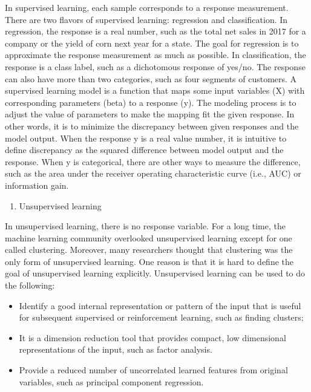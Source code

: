 \documentclass[
  12pt,
]{krantz}
\providecommand{\tightlist}{%
  \setlength{\itemsep}{0pt}\setlength{\parskip}{0pt}}
\begin{document}
In supervised learning, each sample corresponds to a response measurement. There are two flavors of supervised learning: regression and classification. In regression, the response is a real number, such as the total net sales in 2017 for a company or the yield of corn next year for a state. The goal for regression is to approximate the response measurement as much as possible. In classification, the response is a class label, such as a dichotomous response of yes/no. The response can also have more than two categories, such as four segments of customers. A supervised learning model is a function that maps some input variables (X) with corresponding parameters (beta) to a response (y). The modeling process is to adjust the value of parameters to make the mapping fit the given response. In other words, it is to minimize the discrepancy between given responses and the model output. When the response y is a real value number, it is intuitive to define discrepancy as the squared difference between model output and the response. When y is categorical, there are other ways to measure the difference, such as the area under the receiver operating characteristic curve (i.e., AUC) or information gain.

\begin{enumerate}
\def\labelenumi{(\arabic{enumi})}
\setcounter{enumi}{1}
\tightlist
\item
  Unsupervised learning
\end{enumerate}

In unsupervised learning, there is no response variable. For a long time, the machine learning community overlooked unsupervised learning except for one called clustering. Moreover, many researchers thought that clustering was the only form of unsupervised learning. One reason is that it is hard to define the goal of unsupervised learning explicitly. Unsupervised learning can be used to do the following:

\begin{itemize}
\item
  Identify a good internal representation or pattern of the input that is useful for subsequent supervised or reinforcement learning, such as finding clusters;
\item
  It is a dimension reduction tool that provides compact, low dimensional representations of the input, such as factor analysis.
\item
  Provide a reduced number of uncorrelated learned features from original variables, such as principal component regression.
\end{itemize}
\end{document}
